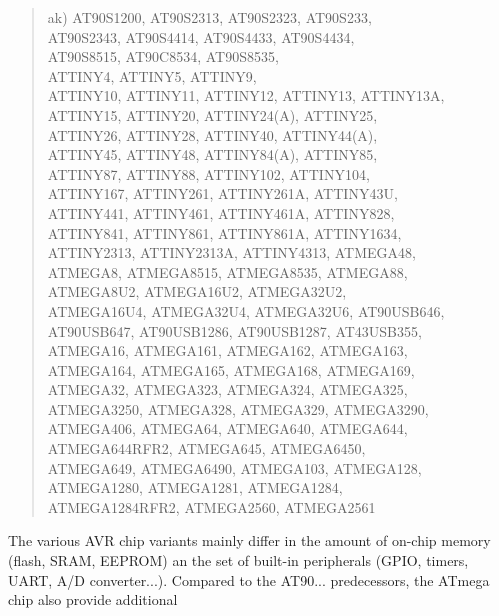 \documentclass[12pt,twoside]{report}
\begin{document}
\begin{quote}
ak) AT90S1200, AT90S2313, AT90S2323, AT90S233,\\
    AT90S2343, AT90S4414, AT90S4433, AT90S4434,\\
    AT90S8515, AT90C8534, AT90S8535,\\
    ATTINY4, ATTINY5, ATTINY9,\\
    ATTINY10, ATTINY11, ATTINY12, ATTINY13, ATTINY13A,\\
    ATTINY15, ATTINY20, ATTINY24(A), ATTINY25,\\
    ATTINY26, ATTINY28, ATTINY40, ATTINY44(A),\\
    ATTINY45, ATTINY48, ATTINY84(A), ATTINY85,\\
    ATTINY87, ATTINY88, ATTINY102, ATTINY104,\\
    ATTINY167, ATTINY261, ATTINY261A, ATTINY43U,\\
    ATTINY441, ATTINY461, ATTINY461A, ATTINY828,\\
    ATTINY841, ATTINY861, ATTINY861A, ATTINY1634,\\
    ATTINY2313, ATTINY2313A, ATTINY4313, ATMEGA48,\\
    ATMEGA8, ATMEGA8515, ATMEGA8535, ATMEGA88,\\
    ATMEGA8U2, ATMEGA16U2, ATMEGA32U2,\\
    ATMEGA16U4, ATMEGA32U4, ATMEGA32U6, AT90USB646,\\
    AT90USB647, AT90USB1286, AT90USB1287, AT43USB355,\\
    ATMEGA16, ATMEGA161, ATMEGA162, ATMEGA163,\\
    ATMEGA164, ATMEGA165, ATMEGA168, ATMEGA169,\\
    ATMEGA32, ATMEGA323, ATMEGA324, ATMEGA325,\\
    ATMEGA3250, ATMEGA328, ATMEGA329, ATMEGA3290,\\
    ATMEGA406, ATMEGA64, ATMEGA640, ATMEGA644,\\
    ATMEGA644RFR2, ATMEGA645, ATMEGA6450,\\
    ATMEGA649, ATMEGA6490, ATMEGA103, ATMEGA128,\\
    ATMEGA1280, ATMEGA1281, ATMEGA1284,\\
    ATMEGA1284RFR2, ATMEGA2560, ATMEGA2561
\end{quote}
The various AVR chip variants mainly differ in the amount of
on-chip memory (flash, SRAM, EEPROM) an the set of built-in
peripherals (GPIO, timers, UART, A/D converter...).  Compared to
the AT90... predecessors, the ATmega chip also provide additional
\end{document}
